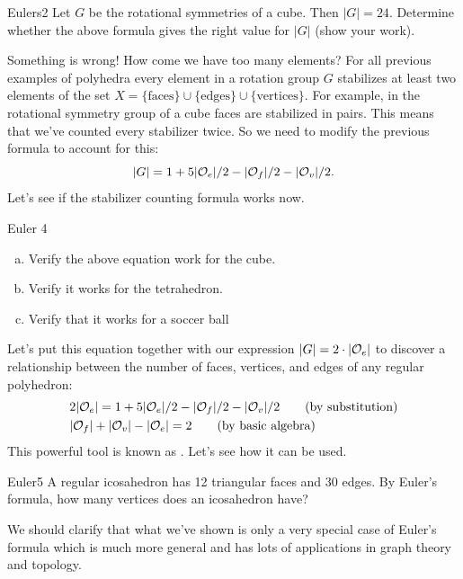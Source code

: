 \begin{exercise}{Eulers2}
Let $G$ be the rotational symmetries of a cube.  Then $|G|=24$.  Determine whether the above formula gives the right value for $|G|$ (show your work).
\end{exercise}
Something is wrong!  How come we have too many elements?
For all previous examples of polyhedra every element in a rotation group $G$ stabilizes at least two elements of the set $X=\{\text{faces}\}\cup\{\text{edges}\}\cup\{\text{vertices}\}$. For example, in the rotational symmetry group of a cube faces are stabilized in pairs.  This means that we've counted every stabilizer twice. So we need to modify the previous formula to account for this: 
$$|G| = 1+ 5|{\cal O}_e|/2-|{\cal O}_f|/2 -|{\cal O}_v|/2 .$$
Let's see if the stabilizer counting formula works now.

\begin {exercise}{Euler 4}
\begin{enumerate}[(a)]
\item Verify the above equation work for the cube.
\item Verify it works for the tetrahedron.
\item Verify that it works for a soccer ball
\end{enumerate}
\end {exercise}

Let's put this equation together with our expression $|G|=2\cdot |{\cal O}_e|$ to discover a relationship between the number of faces, vertices, and edges of any regular polyhedron:
\begin{align*}
& 2|{\cal O}_e|=1+5|{\cal O}_e|/2-|{\cal O}_f|/2-|{\cal O}_v|/2 \qquad \text{(by substitution)}\\
& |{\cal O}_f|+|{\cal O}_v|-|{\cal O}_e|=2 \qquad \text{(by basic algebra)}\\
\end {align*}
This powerful tool is known as .  Let's see how it can be used.

\begin {exercise}{Euler5}
A regular icosahedron has 12 triangular faces and 30 edges.  By Euler's formula, how many vertices does an icosahedron have?
\end {exercise}
We should clarify that what we've shown is only a very special case of Euler's formula which is much more general and has lots of applications in graph theory and topology.  

